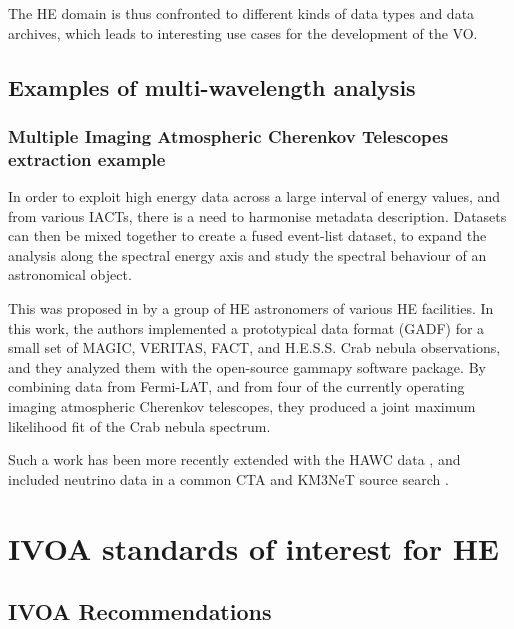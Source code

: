 \documentclass[11pt,a4paper]{ivoa}
\begin{document}
The HE domain is thus confronted to different kinds of data types and data archives, which leads to interesting use cases for the development of the VO.



\subsection{Examples of multi-wavelength analysis}

\subsubsection{Multiple Imaging Atmospheric Cherenkov Telescopes extraction example}

In order to exploit high energy data across a large interval of energy values, and from various IACTs, there is a need to harmonise metadata description.
Datasets can then be mixed together to create a fused event-list dataset, to expand the analysis along the spectral energy axis and study the spectral behaviour of an astronomical object.

This was proposed in \citep{2019A&A...625A..10N} by a group of HE astronomers of various HE facilities.
In this work, the authors implemented a prototypical data format (GADF) for a small set of MAGIC, VERITAS, FACT, and H.E.S.S. Crab nebula observations, and they analyzed them with the open-source gammapy software package. By combining data from Fermi-LAT, and from four of the currently operating imaging atmospheric Cherenkov telescopes, they produced a joint maximum likelihood fit of the Crab nebula spectrum.

Such a work has been more recently extended with the HAWC data \citep{2022A&A...667A..36A}, and included neutrino data in a common CTA and KM3NeT source search \citep{unbehaun2023prospects}.


\section{IVOA standards of interest for HE}

\subsection{IVOA Recommendations}
\end{document}
